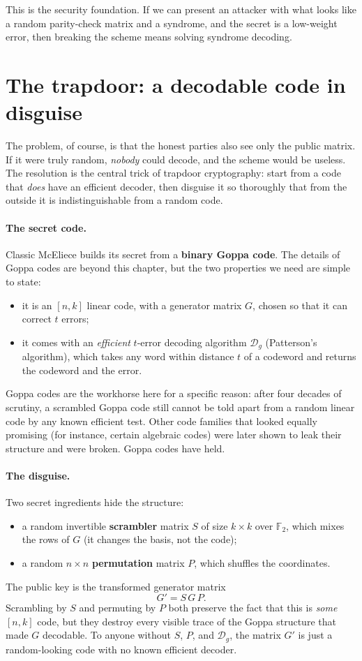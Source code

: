 This is the security foundation. If we can present an attacker with what looks like a random parity-check matrix and a syndrome, and the secret is a low-weight error, then breaking the scheme means solving syndrome decoding.

\section{The trapdoor: a decodable code in disguise}

The problem, of course, is that the honest parties also see only the public matrix. If it were truly random, \emph{nobody} could decode, and the scheme would be useless. The resolution is the central trick of trapdoor cryptography: start from a code that \emph{does} have an efficient decoder, then disguise it so thoroughly that from the outside it is indistinguishable from a random code.

\paragraph{The secret code.}
Classic McEliece builds its secret from a \textbf{binary Goppa code}. The details of Goppa codes are beyond this chapter, but the two properties we need are simple to state:
\begin{itemize}
  \item it is an $[n,k]$ linear code, with a generator matrix $G$, chosen so that it can correct $t$ errors;
  \item it comes with an \emph{efficient} $t$-error decoding algorithm $\mathcal{D}_g$ (Patterson's algorithm), which takes any word within distance $t$ of a codeword and returns the codeword and the error.
\end{itemize}
Goppa codes are the workhorse here for a specific reason: after four decades of scrutiny, a scrambled Goppa code still cannot be told apart from a random linear code by any known efficient test. Other code families that looked equally promising (for instance, certain algebraic codes) were later shown to leak their structure and were broken. Goppa codes have held.

\paragraph{The disguise.}
Two secret ingredients hide the structure:
\begin{itemize}
  \item a random invertible \textbf{scrambler} matrix $S$ of size $k \times k$ over $\mathbb{F}_2$, which mixes the rows of $G$ (it changes the basis, not the code);
  \item a random $n \times n$ \textbf{permutation} matrix $P$, which shuffles the coordinates.
\end{itemize}
The public key is the transformed generator matrix
\[
G' = S\,G\,P .
\]
Scrambling by $S$ and permuting by $P$ both preserve the fact that this is \emph{some} $[n,k]$ code, but they destroy every visible trace of the Goppa structure that made $G$ decodable. To anyone without $S$, $P$, and $\mathcal{D}_g$, the matrix $G'$ is just a random-looking code with no known efficient decoder.

